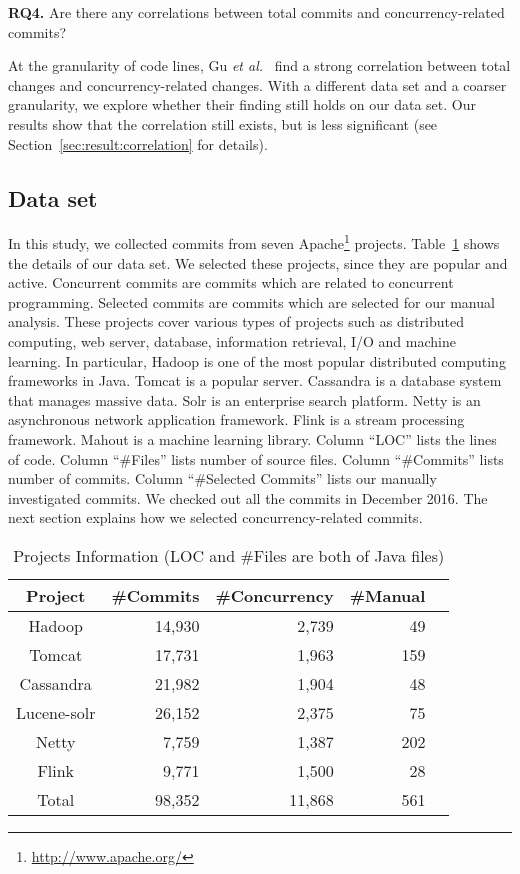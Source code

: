 \textbf{RQ4.} Are there any correlations between total commits and concurrency-related commits?

At the granularity of code lines, Gu \emph{et al.}~\cite{conf/sigsoft/GuJSZL15} find a strong correlation between total changes and concurrency-related changes. With a different data set and a coarser granularity, we explore whether their finding still holds on our data set. Our results show that the correlation still exists, but is less significant (see Section~\ref{sec:result:correlation} for details).

\subsection{Data set}
\label{sec:method:data}
In this study, we collected commits from seven Apache\footnote{\url{http://www.apache.org/}} projects. Table~\ref{table:dataset} shows the details of our data set. We selected these projects, since they are popular and active. Concurrent commits are commits which are related to concurrent programming. Selected commits are commits which are selected for our manual analysis. These projects cover various types of projects such as distributed computing, web server, database, information retrieval, I/O and machine learning. In particular, Hadoop is one of the most popular distributed computing frameworks in Java. Tomcat is a popular server. Cassandra is a database system that manages massive data. Solr is an enterprise search platform. Netty is an asynchronous network application framework. Flink is a stream processing framework. Mahout is a machine learning library. Column ``LOC'' lists the lines of code. Column ``\#Files'' lists number of source files. Column ``\#Commits'' lists number of commits. Column ``\#Selected Commits'' lists our manually investigated commits. We checked out all the commits in December 2016. The next section explains how we selected concurrency-related commits.

\begin{table}
	\centering
	\caption{Projects Information (LOC and \#Files are both of Java files)}
    \label{table:dataset}
	\begin{tabular}{|c|r|r|r|r|}\hline
		Project&\#Commits&\#Concurrency&\#Manual\\\hline
		Hadoop&14,930&2,739&49\\
		Tomcat&17,731&1,963&159\\
		Cassandra&21,982&1,904&48\\
		Lucene-solr&26,152&2,375&75\\
		Netty&7,759&1,387&202\\
		Flink&9,771&1,500&28\\\hline
		Total&98,352&11,868&561\\\hline
	\end{tabular}
\end{table}

